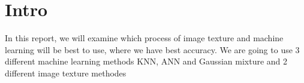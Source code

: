 \chapter{Intro}

In this report, we will examine which process of image texture and machine learning will be best to use, where we have best accuracy. We are going to use 3 different machine learning methods KNN, ANN and Gaussian mixture and 2 different image texture methodes 